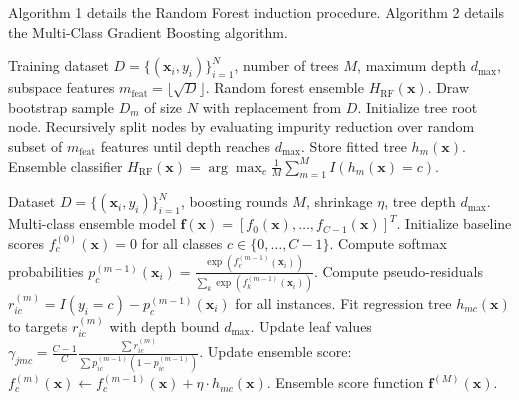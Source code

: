 \documentclass[10pt,conference,compsoc]{IEEEtran}
\begin{document}
Algorithm 1 details the Random Forest induction procedure. Algorithm 2 details the Multi-Class Gradient Boosting algorithm.

\begin{algorithm}[t]
\caption{Random forest ensemble classifier induction}
\begin{algorithmic}[1]
\REQUIRE Training dataset $D = \{(\mathbf{x}_i, y_i)\}_{i=1}^N$, number of trees $M$, maximum depth $d_{\text{max}}$, subspace features $m_{\text{feat}} = \lfloor \sqrt{D} \rfloor$.
\ENSURE Random forest ensemble $H_{\text{RF}}(\mathbf{x})$.
    \STATE Draw bootstrap sample $D_m$ of size $N$ with replacement from $D$.
    \STATE Initialize tree root node.
    \STATE Recursively split nodes by evaluating impurity reduction over random subset of $m_{\text{feat}}$ features until depth reaches $d_{\text{max}}$.
    \STATE Store fitted tree $h_m(\mathbf{x})$.
\ENDFOR
\RETURN Ensemble classifier $H_{\text{RF}}(\mathbf{x}) = \arg\max_c \frac{1}{M} \sum_{m=1}^M I(h_m(\mathbf{x}) = c)$.
\end{algorithmic}
\end{algorithm}

\begin{algorithm}[t]
\caption{Multi-class gradient boosted decision trees}
\begin{algorithmic}[1]
\REQUIRE Dataset $D = \{(\mathbf{x}_i, y_i)\}_{i=1}^N$, boosting rounds $M$, shrinkage $\eta$, tree depth $d_{\text{max}}$.
\ENSURE Multi-class ensemble model $\mathbf{f}(\mathbf{x}) = [f_0(\mathbf{x}), \dots, f_{C-1}(\mathbf{x})]^T$.
\STATE Initialize baseline scores $f_c^{(0)}(\mathbf{x}) = 0$ for all classes $c \in \{0, \dots, C-1\}$.
    \STATE Compute softmax probabilities $p_c^{(m-1)}(\mathbf{x}_i) = \frac{\exp(f_c^{(m-1)}(\mathbf{x}_i))}{\sum_{k} \exp(f_k^{(m-1)}(\mathbf{x}_i))}$.
        \STATE Compute pseudo-residuals $r_{ic}^{(m)} = I(y_i = c) - p_c^{(m-1)}(\mathbf{x}_i)$ for all instances.
        \STATE Fit regression tree $h_{mc}(\mathbf{x})$ to targets $r_{ic}^{(m)}$ with depth bound $d_{\text{max}}$.
        \STATE Update leaf values $\gamma_{jmc} = \frac{C-1}{C} \frac{\sum r_{ic}^{(m)}}{\sum p_{ic}^{(m-1)}(1 - p_{ic}^{(m-1)})}$.
        \STATE Update ensemble score: $f_c^{(m)}(\mathbf{x}) \leftarrow f_c^{(m-1)}(\mathbf{x}) + \eta \cdot h_{mc}(\mathbf{x})$.
    \ENDFOR
\ENDFOR
\RETURN Ensemble score function $\mathbf{f}^{(M)}(\mathbf{x})$.
\end{algorithmic}
\end{algorithm}
\end{document}
